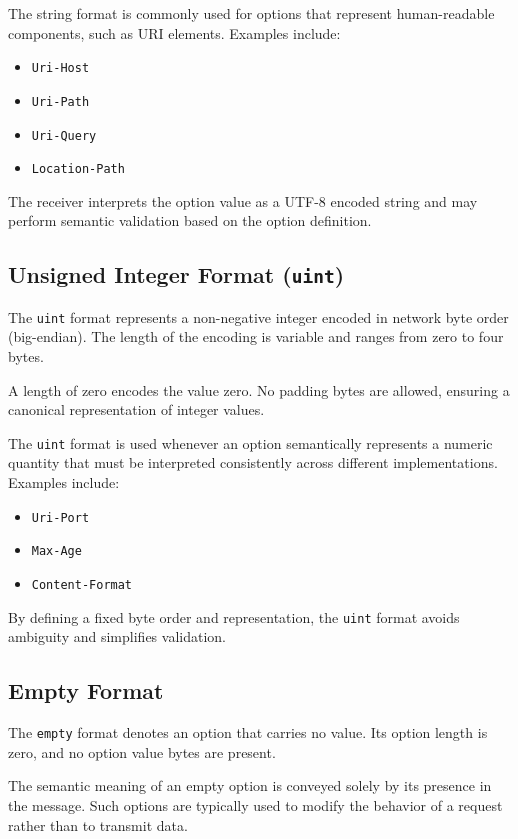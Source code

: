 \documentclass{scrbook}
\begin{document}
The string format is commonly used for options that represent human-readable components, such as URI elements. Examples include:

\begin{itemize}
    \item \texttt{Uri-Host}
    \item \texttt{Uri-Path}
    \item \texttt{Uri-Query}
    \item \texttt{Location-Path}
\end{itemize}

The receiver interprets the option value as a UTF-8 encoded string and may perform semantic validation based on the option definition.

\subsection{Unsigned Integer Format (\texttt{uint})}

The \texttt{uint} format represents a non-negative integer encoded in network byte order (big-endian). The length of the encoding is variable and ranges from zero to four bytes.

A length of zero encodes the value zero. No padding bytes are allowed, ensuring a canonical representation of integer values.

The \texttt{uint} format is used whenever an option semantically represents a numeric quantity that must be interpreted consistently across different implementations. Examples include:

\begin{itemize}
    \item \texttt{Uri-Port}
    \item \texttt{Max-Age}
    \item \texttt{Content-Format}
\end{itemize}

By defining a fixed byte order and representation, the \texttt{uint} format avoids ambiguity and simplifies validation.

\subsection{Empty Format}

The \texttt{empty} format denotes an option that carries no value. Its option length is zero, and no option value bytes are present.

The semantic meaning of an empty option is conveyed solely by its presence in the message. Such options are typically used to modify the behavior of a request rather than to transmit data.
\end{document}

